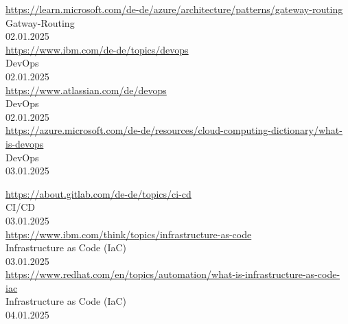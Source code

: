 \begin{thebibliography}{999}
    \href{https://learn.microsoft.com/de-de/azure/architecture/patterns/gateway-routing}{https://learn.microsoft.com/de-de/azure/architecture/patterns/gateway-routing} \\
    Gatway-Routing \\
    02.01.2025 \\

    \href{https://www.ibm.com/de-de/topics/devops}{https://www.ibm.com/de-de/topics/devops} \\
    DevOps \\
    02.01.2025 \\

    \href{https://www.atlassian.com/de/devops}{https://www.atlassian.com/de/devops} \\
    DevOps \\
    02.01.2025 \\

    \href{https://azure.microsoft.com/de-de/resources/cloud-computing-dictionary/what-is-devops}{https://azure.microsoft.com/de-de/resources/cloud-computing-dictionary/what-is-devops} \\
    DevOps \\
    03.01.2025 \\

    \clearpage

    \href{https://about.gitlab.com/de-de/topics/ci-cd}{https://about.gitlab.com/de-de/topics/ci-cd} \\
    CI/CD \\
    03.01.2025 \\

    \href{https://www.ibm.com/think/topics/infrastructure-as-code}{https://www.ibm.com/think/topics/infrastructure-as-code} \\
    Infrastructure as Code (IaC) \\
    03.01.2025 \\

    \href{https://www.redhat.com/en/topics/automation/what-is-infrastructure-as-code-iac}{https://www.redhat.com/en/topics/automation/what-is-infrastructure-as-code-iac} \\
    Infrastructure as Code (IaC) \\
    04.01.2025 \\


\end{thebibliography}
